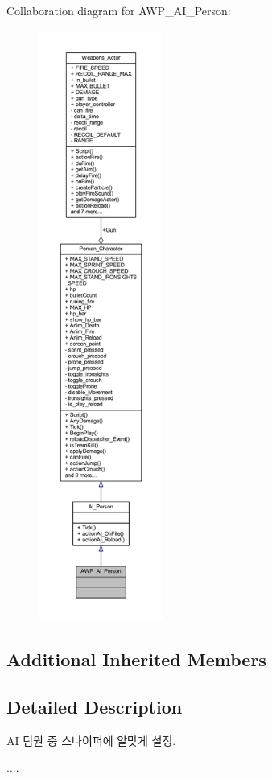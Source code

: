 Collaboration diagram for A\+W\+P\+\_\+\+A\+I\+\_\+\+Person\+:\nopagebreak
\begin{figure}[H]
\begin{center}
\leavevmode
\includegraphics[height=550pt]{class_a_w_p___a_i___person__coll__graph}
\end{center}
\end{figure}
\subsection*{Additional Inherited Members}


\subsection{Detailed Description}
AI 팀원 중 스나이퍼에 알맞게 설정. 

.... 
